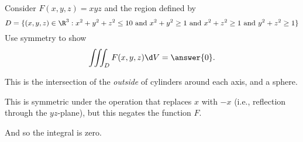 \documentclass{ximera}
\author{Jim Fowler}
\begin{document}
\begin{exercise}
Consider $F(x,y,z) = xyz$ and the region defined by
$$
D = \{ (x,y,z) \in \R^3 : x^2 + y^2 + z^2 \leq 10 \mbox{ and } x^2 + y^2
\geq 1 \mbox{ and } x^2 + z^2 \geq 1 \mbox{ and } y^2 + z^2 \geq 1 \}
$$
Use symmetry to show
\[
  \iiint_D F(x,y,z) \d V = \answer{0}.
\]

\begin{hint}
  This is the intersection of the \textit{outside} of cylinders around each
  axis, and a sphere.
\end{hint}
\begin{hint}
  This is symmetric under the operation that replaces $x$ with $-x$ (i.e., reflection through the $yz$-plane), but this negates the function $F$.
\end{hint}
\begin{hint}
And so the integral is zero.
\end{hint}
\end{exercise}
\end{document}
